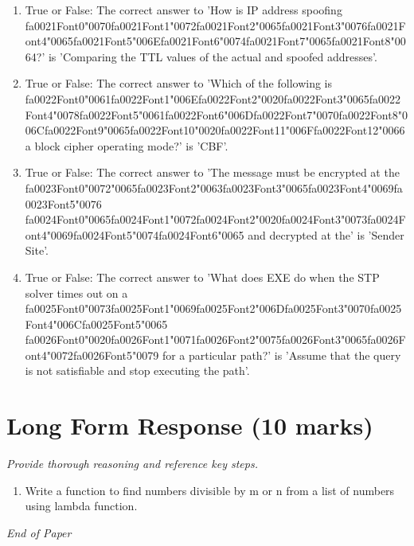 \documentclass[12pt]{article}
\begin{document}
\begin{enumerate}[label=\arabic*.]
\item True or False: The correct answer to 'How is IP address spoofing {\csname fa0021Font0\endcsname\char"0070}{\csname fa0021Font1\endcsname\char"0072}{\csname fa0021Font2\endcsname\char"0065}{\csname fa0021Font3\endcsname\char"0076}{\csname fa0021Font4\endcsname\char"0065}{\csname fa0021Font5\endcsname\char"006E}{\csname fa0021Font6\endcsname\char"0074}{\csname fa0021Font7\endcsname\char"0065}{\csname fa0021Font8\endcsname\char"0064}?' is 'Comparing the TTL values of the actual and spoofed addresses'.
\item True or False: The correct answer to 'Which of the following is {\csname fa0022Font0\endcsname\char"0061}{\csname fa0022Font1\endcsname\char"006E}{\csname fa0022Font2\endcsname\char"0020}{\csname fa0022Font3\endcsname\char"0065}{\csname fa0022Font4\endcsname\char"0078}{\csname fa0022Font5\endcsname\char"0061}{\csname fa0022Font6\endcsname\char"006D}{\csname fa0022Font7\endcsname\char"0070}{\csname fa0022Font8\endcsname\char"006C}{\csname fa0022Font9\endcsname\char"0065}{\csname fa0022Font10\endcsname\char"0020}{\csname fa0022Font11\endcsname\char"006F}{\csname fa0022Font12\endcsname\char"0066} a block cipher operating mode?' is 'CBF'.
\item True or False: The correct answer to 'The message must be encrypted at the {\csname fa0023Font0\endcsname\char"0072}{\char"0065}{\csname fa0023Font2\endcsname\char"0063}{\csname fa0023Font3\endcsname\char"0065}{\csname fa0023Font4\endcsname\char"0069}{\csname fa0023Font5\endcsname\char"0076} {\csname fa0024Font0\endcsname\char"0065}{\csname fa0024Font1\endcsname\char"0072}{\csname fa0024Font2\endcsname\char"0020}{\csname fa0024Font3\endcsname\char"0073}{\csname fa0024Font4\endcsname\char"0069}{\csname fa0024Font5\endcsname\char"0074}{\csname fa0024Font6\endcsname\char"0065} and decrypted at the' is 'Sender Site'.
\item True or False: The correct answer to 'What does EXE do when the STP solver times out on a {\csname fa0025Font0\endcsname\char"0073}{\csname fa0025Font1\endcsname\char"0069}{\csname fa0025Font2\endcsname\char"006D}{\csname fa0025Font3\endcsname\char"0070}{\csname fa0025Font4\endcsname\char"006C}{\csname fa0025Font5\endcsname\char"0065} {\csname fa0026Font0\endcsname\char"0020}{\csname fa0026Font1\endcsname\char"0071}{\csname fa0026Font2\endcsname\char"0075}{\csname fa0026Font3\endcsname\char"0065}{\csname fa0026Font4\endcsname\char"0072}{\csname fa0026Font5\endcsname\char"0079} for a particular path?' is 'Assume that the query is not satisfiable and stop executing the path'.
\end{enumerate}

\section*{Long Form Response (10 marks)}
\textit{Provide thorough reasoning and reference key steps.}
\begin{enumerate}[label=\arabic*.]
\item Write a function to find numbers divisible by m or n from a list of numbers using lambda
function.
\end{enumerate}

\vfill
\noindent\textit{End of Paper}
\end{document}
